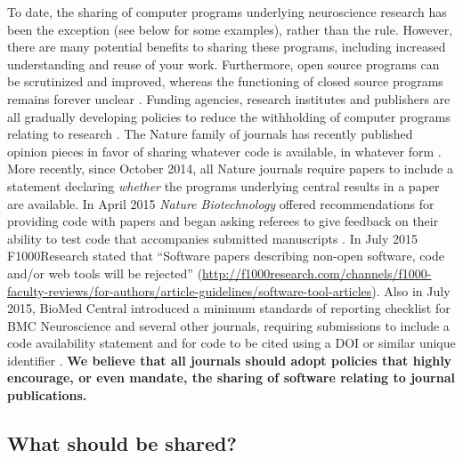 \documentclass[11pt]{article}
\begin{document}
To date, the sharing of computer programs underlying neuroscience
research has been the exception (see below for some examples), rather
than the rule.  However, there are many potential benefits to sharing
these programs, including increased understanding and reuse of your
work.  Furthermore, open source programs can be scrutinized and
improved, whereas the functioning of closed source programs remains
forever unclear \cite{Vihinen2015}.  Funding agencies, research
institutes and publishers are all gradually developing policies to
reduce the withholding of computer programs relating to research
\cite{Morin2012-65e}.  The Nature family of journals has recently
published opinion pieces in favor of sharing whatever code is
available, in whatever form \cite{Barnes2010-iv,Ince2012-225}.  More
recently, since October 2014, all Nature journals require papers to
include a statement declaring \textit{whether} the programs underlying
central results in a paper are available. In April 2015 \textit{Nature
  Biotechnology} offered recommendations for providing code with
papers and began asking referees to give feedback on their ability to
test code that accompanies submitted manuscripts
\cite{NatBiotech2015}.  In July 2015 F1000Research stated that
``Software papers describing non-open software, code and/or web tools
will be rejected''
(\url{http://f1000research.com/channels/f1000-faculty-reviews/for-authors/article-guidelines/software-tool-articles}). Also
in July 2015, BioMed Central introduced a minimum standards of
reporting checklist for BMC Neuroscience and several other journals,
requiring submissions to include a code availability statement and for
code to be cited using a DOI or similar unique identifier
\cite{Kenall2015}.  \textbf{We believe that all journals should adopt
  policies that highly encourage, or even mandate, the sharing of
  software relating to journal publications.}

\subsection*{What should be shared?}
\end{document}
